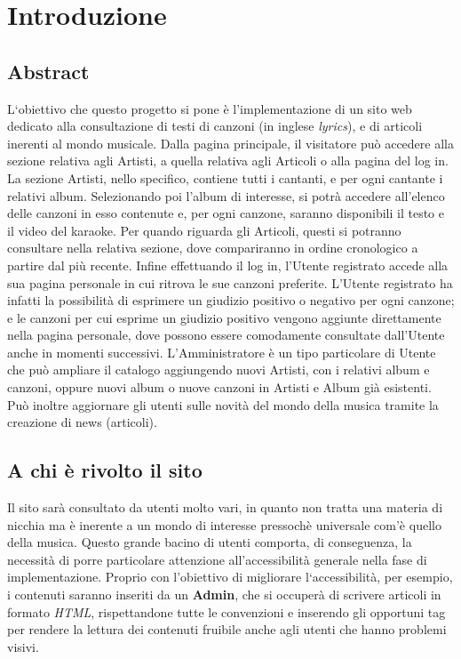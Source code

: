 \section{Introduzione}

\subsection{Abstract}
L`obiettivo che questo progetto si pone \`e l'implementazione di un sito web dedicato alla consultazione di testi di canzoni (in inglese \textit{lyrics}), e di articoli inerenti al mondo musicale. 
Dalla pagina principale, il visitatore pu\`o accedere alla sezione relativa agli Artisti, a quella relativa agli Articoli o alla pagina del log in.
La sezione Artisti, nello specifico, contiene tutti i cantanti, e per ogni cantante i relativi album. Selezionando poi l'album di interesse, si potr\`a accedere all'elenco delle canzoni in esso contenute e, per ogni canzone, saranno disponibili il testo e il video del karaoke.
Per quando riguarda gli Articoli, questi si potranno consultare nella relativa sezione, dove compariranno in ordine cronologico a partire dal pi\`u recente.
Infine effettuando il log in, l'Utente registrato accede alla sua pagina personale in cui ritrova le sue canzoni preferite. L'Utente registrato ha infatti la possibilit\`a di esprimere un giudizio positivo o negativo per ogni canzone; e le canzoni per cui esprime un giudizio positivo vengono aggiunte direttamente nella pagina personale, dove possono essere comodamente consultate dall'Utente anche in momenti successivi.
L'Amministratore è un tipo particolare di Utente che pu\`o ampliare il catalogo aggiungendo nuovi Artisti, con i relativi album e canzoni, oppure nuovi album o nuove canzoni in Artisti e Album gi\`a esistenti. Può inoltre aggiornare gli utenti sulle novità del mondo della musica tramite la creazione di news (articoli).


\newpage %


\subsection{A chi è rivolto il sito}
Il sito sar\`a consultato da utenti molto vari, in quanto non tratta una materia di nicchia ma \`e inerente a un mondo di interesse pressoch\`e universale com'\`e quello della musica. Questo grande bacino di utenti comporta, di conseguenza, la necessit\`a di porre particolare attenzione all'accessibilit\`a generale nella fase di implementazione. Proprio con l'obiettivo di migliorare l`accessibilit\`a, per esempio, i contenuti saranno inseriti da un \textbf{Admin}, che si occuperà di scrivere articoli in formato \textit{HTML}, rispettandone tutte le convenzioni e inserendo gli opportuni tag per rendere la lettura dei contenuti fruibile anche agli utenti che hanno problemi visivi.


